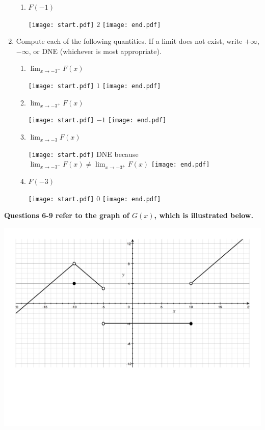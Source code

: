 \documentclass[12pt]{article}
\begin{document}
\begin{enumerate}
\begin{enumerate}
\item $F(-1)$

\texttt{[image: start.pdf]}
{{$2$}}
\texttt{[image: end.pdf]}


\end{enumerate}

\item Compute each of the following quantities.  If a limit does not exist, write $+\infty$, $-\infty$, or DNE (whichever is most appropriate). 

\begin{enumerate}

\item $\displaystyle \lim_{x \rightarrow -3^{-}}{F(x)}$

\texttt{[image: start.pdf]}
{{$1$}}
\texttt{[image: end.pdf]}


\item $\displaystyle \lim_{x \rightarrow -3^{+}}{F(x)}$

\texttt{[image: start.pdf]}
{{$-1$}}
\texttt{[image: end.pdf]}


\item $\displaystyle \lim_{x \rightarrow -3}{F(x)}$

\texttt{[image: start.pdf]}
{{DNE because $\displaystyle \lim_{x \rightarrow -3^{-}}{F(x)} \neq \lim_{x \rightarrow -3^{+}}{F(x)}$}}
\texttt{[image: end.pdf]}


\item $F(-3)$

\texttt{[image: start.pdf]}
{{$0$}}
\texttt{[image: end.pdf]}


\end{enumerate}

\end{enumerate}

{\bf Questions 6-9 refer to the graph of $G(x)$, which is illustrated below.}

\begin{center}
\includegraphics[scale=0.5]{Limits2.pdf}
\end{center}
\end{document}
